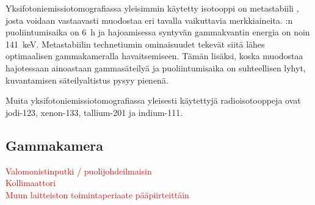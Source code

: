 Yksifotoniemissiotomografiassa yleisimmin käytetty isotooppi on metastabiili , josta voidaan vastaavasti muodostaa eri tavalla vaikuttavia merkkiaineita. :n puoliintumisaika on \qty{6}{\hour} ja hajoamisessa syntyvän gammakvantin energia on noin \qty{141}{\kilo\electronvolt}.\cite{cherry_interaction_2012, cherry_single_2012, crisan_radiopharmaceuticals_2022} Metastabiilin technetiumin ominaisuudet tekevät siitä lähes optimaalisen gammakameralla havaitsemiseen. Tämän lisäksi, koska  muodostaa hajotessaan ainoastaan gammasäteilyä ja puoliintumisaika on suhteellisen lyhyt, kuvantamisen säteilyaltistus pysyy pienenä.\cite{cherry_modes_2012, crisan_radiopharmaceuticals_2022}

Muita yksifotoniemissiotomografiassa yleisesti käytettyjä radioisotooppeja ovat jodi-123, xenon-133, tallium-201 ja indium-111\cite{crisan_radiopharmaceuticals_2022}.

\subsection{Gammakamera}
\textcolor{red}{Valomonistinputki / puolijohdeilmaisin}\\
\textcolor{red}{Kollimaattori}\\
\textcolor{red}{Muun laitteiston toimintaperiaate pääpiirteittäin}